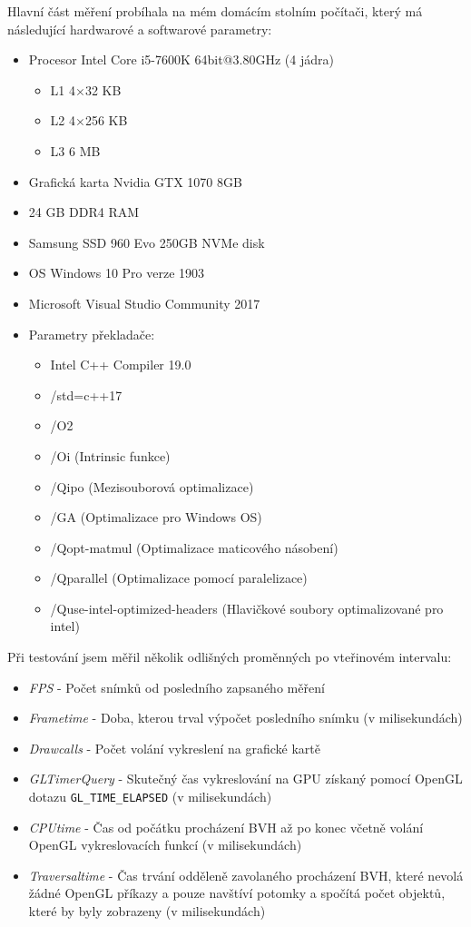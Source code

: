 \documentclass[report,11pt]{elsarticle}
\begin{document}
Hlavní část měření probíhala na mém domácím stolním počítači, který má
následující hardwarové a softwarové parametry:
\begin{itemize}
    \item Procesor Intel Core i5-7600K 64bit@3.80GHz (4 jádra)
    \begin{itemize}
        \item L1 4$\times$32 KB
        \item L2 4$\times$256 KB
        \item L3 6 MB
    \end{itemize}
    \item Grafická karta Nvidia GTX 1070 8GB
    \item 24 GB DDR4 RAM
    \item Samsung SSD 960 Evo 250GB NVMe disk
    \item OS Windows 10 Pro verze 1903
    \item Microsoft Visual Studio Community 2017
    \item Parametry překladače:
    \begin{itemize}
        \item Intel C++ Compiler 19.0
        \item /std=c++17
        \item /O2
        \item /Oi (Intrinsic funkce)
        \item /Qipo (Mezisouborová optimalizace)
        \item /GA (Optimalizace pro Windows OS)
        \item /Qopt-matmul (Optimalizace maticového násobení)
        \item /Qparallel (Optimalizace pomocí paralelizace)
        \item /Quse-intel-optimized-headers (Hlavičkové soubory optimalizované pro intel)
    \end{itemize}
\end{itemize}

Při testování jsem měřil několik odlišných proměnných po vteřinovém intervalu:
\begin{itemize}
  \item \textit{FPS} - Počet snímků od posledního zapsaného měření
  \item \textit{Frametime} - Doba, kterou trval výpočet posledního snímku (v milisekundách)
  \item \textit{Drawcalls} - Počet volání vykreslení na grafické kartě
  \item \textit{GLTimerQuery} - Skutečný čas vykreslování na GPU získaný pomocí OpenGL
      dotazu \texttt{GL\_TIME\_ELAPSED} (v milisekundách)
  \item \textit{CPUtime} - Čas od počátku procházení BVH až po konec včetně volání OpenGL
      vykreslovacích funkcí (v milisekundách)
  \item \textit{Traversaltime} - Čas trvání odděleně zavolaného procházení BVH,
      které nevolá žádné OpenGL příkazy a pouze navštíví potomky a spočítá počet
      objektů, které by byly zobrazeny (v milisekundách)
\end{itemize}
\end{document}

